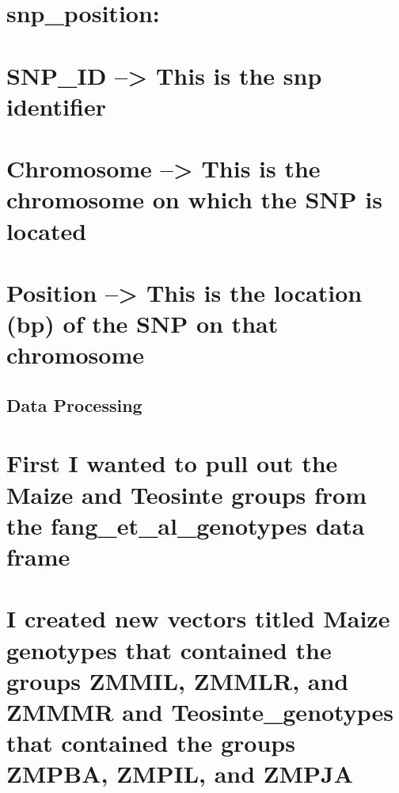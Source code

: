 \documentclass[
]{article}
\begin{document}
\section{snp\_position:}\label{snp_position}

\section{SNP\_ID --\textgreater{} This is the snp
identifier}\label{snp_id-this-is-the-snp-identifier}

\section{Chromosome --\textgreater{} This is the chromosome on which the
SNP is
located}\label{chromosome-this-is-the-chromosome-on-which-the-snp-is-located}

\section{Position --\textgreater{} This is the location (bp) of the SNP
on that
chromosome}\label{position-this-is-the-location-bp-of-the-snp-on-that-chromosome}

\subsection{Data Processing}\label{data-processing}

\section{First I wanted to pull out the Maize and Teosinte groups from
the fang\_et\_al\_genotypes data
frame}\label{first-i-wanted-to-pull-out-the-maize-and-teosinte-groups-from-the-fang_et_al_genotypes-data-frame}

\section{I created new vectors titled Maize genotypes that contained the
groups ZMMIL, ZMMLR, and ZMMMR and Teosinte\_genotypes that contained
the groups ZMPBA, ZMPIL, and
ZMPJA}\label{i-created-new-vectors-titled-maize-genotypes-that-contained-the-groups-zmmil-zmmlr-and-zmmmr-and-teosinte_genotypes-that-contained-the-groups-zmpba-zmpil-and-zmpja}
\end{document}
